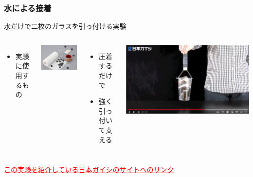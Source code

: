 \documentclass[unicode,12pt]{beamer}%
\begin{document}
\begin{frame}
	\frametitle{水による接着}
		\begin{block}{水だけで二枚のガラスを引っ付ける実験}
			\begin{columns}[c, onlytextwidth]
					\begin{itemize}
						\item 実験に使用するもの
					\end{itemize}
	
					\centering
					\includegraphics[width=.9\textwidth]{glass_water3.jpg}
	
	
				\begin{itemize}
					\item 圧着するだけで
					\item 強く引っ付いて支える
				\end{itemize}
	
				\centering
				\includegraphics[width=\textwidth]{glass_water2.png}
			\end{columns}
	
			\vspace{5mm}
			\href{https://site.ngk.co.jp/lab/no230/}{\textcolor{red}{\underline{\scriptsize{この実験を紹介している日本ガイシのサイトへのリンク}}}}
		\end{block}
\end{frame}
\end{document}
